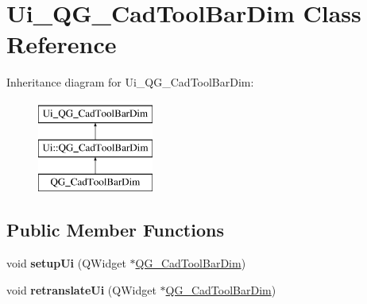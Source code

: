 \hypertarget{classUi__QG__CadToolBarDim}{\section{Ui\-\_\-\-Q\-G\-\_\-\-Cad\-Tool\-Bar\-Dim Class Reference}
\label{classUi__QG__CadToolBarDim}
}
Inheritance diagram for Ui\-\_\-\-Q\-G\-\_\-\-Cad\-Tool\-Bar\-Dim\-:\begin{figure}[H]
\begin{center}
\leavevmode
\includegraphics[height=3.000000cm]{classUi__QG__CadToolBarDim}
\end{center}
\end{figure}
\subsection*{Public Member Functions}
\begin{DoxyCompactItemize}
\item 
\hypertarget{classUi__QG__CadToolBarDim_a6670d7c7ff2552ff03c613f09219431f}{void {\bfseries setup\-Ui} (Q\-Widget $\ast$\hyperlink{classQG__CadToolBarDim}{Q\-G\-\_\-\-Cad\-Tool\-Bar\-Dim})}\label{classUi__QG__CadToolBarDim_a6670d7c7ff2552ff03c613f09219431f}

\item 
\hypertarget{classUi__QG__CadToolBarDim_a11d82454bd1c5fbc07ff0b63758cbaed}{void {\bfseries retranslate\-Ui} (Q\-Widget $\ast$\hyperlink{classQG__CadToolBarDim}{Q\-G\-\_\-\-Cad\-Tool\-Bar\-Dim})}\label{classUi__QG__CadToolBarDim_a11d82454bd1c5fbc07ff0b63758cbaed}

\end{DoxyCompactItemize}
